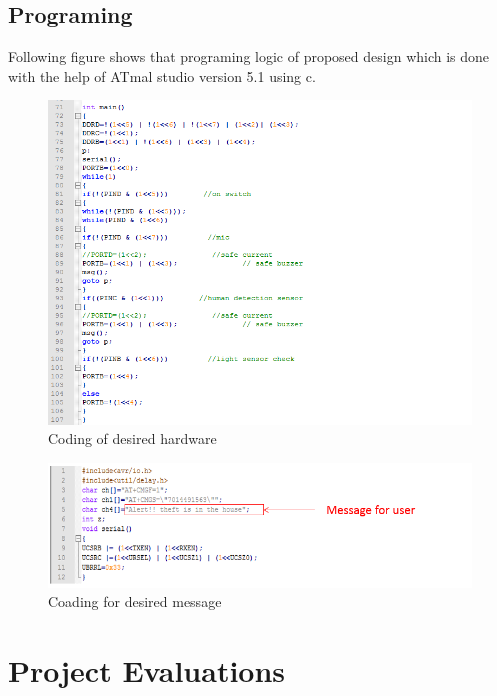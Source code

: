 \documentclass[twoside,a4paper,16pt]{book}
\begin{document}
{\section{Programing}
Following figure shows that programing logic of proposed design which is done with the help of ATmal studio version 5.1 using c.
\newpage
\begin{figure}[ht!]
	\begin{left}
		\includegraphics[width=15.0cm]{p5.png}
		\caption{Coding of desired hardware }
	\end{left}
\end{figure}
\begin{figure}[ht!]
	\begin{left}
		\includegraphics[width=15.0cm]{p7.png}
		\caption{Coading for desired message }
	\end{left}
\end{figure}

 \chapter{Project Evaluations }
}
\end{document}
